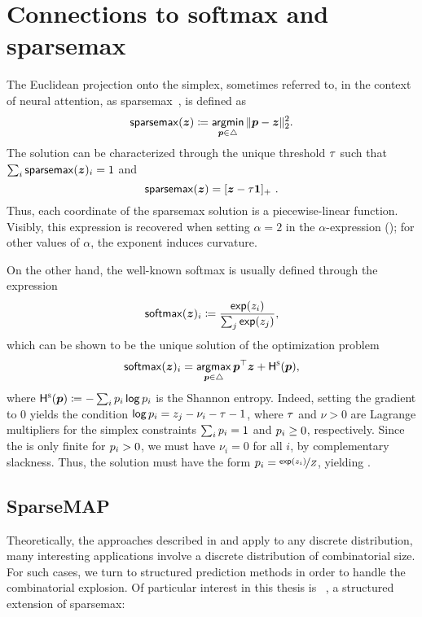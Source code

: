 \section*{Connections to softmax and sparsemax}\label{sec:softmax}
The Euclidean projection onto the simplex, sometimes referred to, in the context of
neural attention, as sparsemax~\citep{sparsemax},
is defined as
\begin{equation}
    \operatorname*{\mathsf{sparsemax}}(\bm{z}) \coloneqq \operatorname*{\mathsf{argmin}}_{\bm{p} \in \triangle} \| \bm{p} - \bm{z} \|_2^2.
\end{equation}
The solution can be characterized through the
unique threshold $\tau$ such that $\sum_i
    \operatorname*{\mathsf{sparsemax}}(\bm{z})_i = 1$ and \citet{Held1974}
\begin{equation}
    \operatorname*{\mathsf{sparsemax}}(\bm{z}) = [\bm{z} - \tau \bm{1}]_+~.
\end{equation}
Thus, each coordinate of the sparsemax solution is a piecewise-linear function.
Visibly, this expression is recovered when setting $\alpha=2$ in the
$\alpha$-\entmaxtext expression (); for other
values of $\alpha$, the exponent induces curvature.

On the other hand, the well-known softmax is usually defined through the
expression
\begin{equation}\label{eq:softmax-supp}
    \operatorname*{\mathsf{softmax}}(\bm{z})_i \coloneqq \frac{\operatorname*{\mathsf{exp}}(z_i)}{\sum_j \operatorname*{\mathsf{exp}}(z_j)},
\end{equation}
which can be shown to be the unique solution of the optimization problem
\begin{equation}
    \operatorname*{\mathsf{softmax}}(\bm{z})_i =
    \operatorname*{\mathsf{argmax}}_{\bm{p} \in \triangle} \bm{p}^\top\bm{z} + \mathsf{H}^{\textsc{s}}(\bm{p}),
\end{equation}
where $\mathsf{H}^{\textsc{s}}(\bm{p}) \coloneqq -\sum_i p_i \operatorname*{\mathsf{log}} p_i$ is the Shannon entropy.
Indeed, setting the gradient to $0$ yields the condition
$\operatorname*{\mathsf{log}} p_i = z_j - \nu_i - \tau - 1$, where $\tau$ and $\nu > 0$ are Lagrange
multipliers for the simplex constraints $\sum_i p_i = 1$ and $p_i \geq 0$,
respectively. Since the \lhs is only finite for $p_i>0$,
we must have $\nu_i=0$ for all $i$, by complementary
slackness. Thus, the solution must have the form $p_i =
    \nicefrac{\operatorname*{\mathsf{exp}}(z_i)}{Z}$, yielding .

\subsection{SparseMAP}\label{sec:smap_bg}

Theoretically, the approaches described in 
and  apply to any discrete distribution, many
interesting applications involve a discrete distribution of
combinatorial size. For such cases, we turn to structured prediction
methods in order to handle the combinatorial explosion. Of particular
interest in this thesis is \smap~\citep{niculae2018sparsemap,
    sparsemapcg}, a structured extension of sparsemax:

